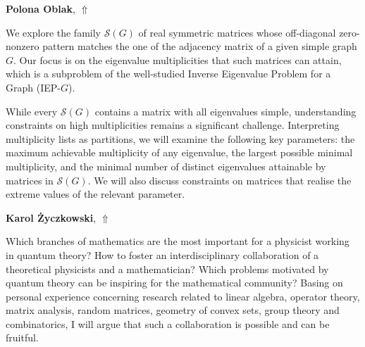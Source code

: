 \documentclass[ILAS2025-program.tex]{subfiles}
\begin{document}
\hypertarget{down0002}{}\begin{ilasabstract}
    
\textbf{Polona Oblak},  \hfill \hyperlink{up0002}{$\Uparrow$}
    
    
\mtskip
    We explore the family ${\mathcal S}(G)$ of real symmetric matrices whose off-diagonal zero-nonzero pattern matches the one of the adjacency matrix of a given simple graph $G$. Our focus is on the eigenvalue multiplicities that such matrices can attain, which is a subproblem of the well-studied Inverse Eigenvalue Problem for a Graph (IEP-$G$).



While every ${\mathcal S}(G)$ contains a matrix with all eigenvalues simple, understanding constraints on high multiplicities remains a significant challenge. 
Interpreting multiplicity lists as partitions, we will examine the following key parameters: the maximum achievable multiplicity of any eigenvalue, the largest possible minimal multiplicity, and the minimal number of distinct eigenvalues attainable by matrices in ${\mathcal S}(G)$.
We will also discuss constraints on matrices that realise the extreme values of the relevant parameter.

\end{ilasabstract}
    

\hypertarget{down0000}{}\begin{ilasabstract}
    
\textbf{Karol Życzkowski},  \hfill \hyperlink{up0000}{$\Uparrow$}
    
    
\mtskip
    Which branches of mathematics are the most important for a physicist working in quantum theory? 
How to foster an interdisciplinary collaboration of a theoretical physicists and a mathematician?
Which problems motivated by quantum theory can be inspiring for the mathematical community?  
Basing on personal experience concerning research related to linear algebra, operator theory, matrix analysis, random matrices, geometry of convex sets, group theory and combinatorics, I will argue that such a collaboration is possible and can be fruitful.

\end{ilasabstract}
    \newpage
\end{document}
